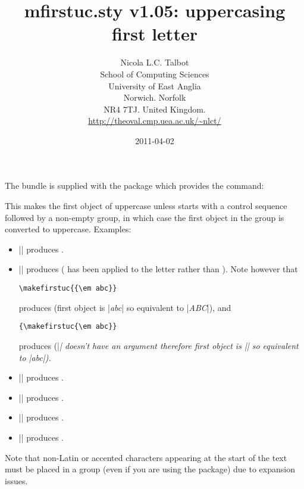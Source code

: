 \documentclass{nlctdoc}
\begin{document}
 \title{mfirstuc.sty v1.05: uppercasing first letter}
 \author{Nicola L.C. Talbot\\[10pt]
School of Computing Sciences\\
University of East Anglia\\
Norwich. Norfolk\\
NR4 7TJ. United Kingdom.\\
\url{http://theoval.cmp.uea.ac.uk/~nlct/}}

 \date{2011-04-02}
 \maketitle

The  bundle is supplied with the package 
 which provides the command:
\begin{definition}[\DescribeMacro{\makefirstuc}]
\end{definition}
This makes the first object of
 uppercase unless  starts with a control
sequence followed by a non-empty group, in which case the first
object in the group is converted to uppercase. Examples:
\begin{itemize}
\item || produces .

\item || produces 
( has been applied to the letter  rather
than ). Note however that
\begin{verbatim}
\makefirstuc{{\em abc}}
\end{verbatim}
produces  (first object is |{\em abc}| so
equivalent to |\MakeUppercase{\em abc}|), and
\begin{verbatim}
{\makefirstuc{\em abc}}
\end{verbatim}
produces {} (|\em| doesn't have an argument
therefore first object is |\em| so equivalent to
|{\MakeUppercase{\em}abc}|).

\item || produces .

\item || produces .

\item || produces .

\item || produces .

\end{itemize}
Note that non-Latin or accented characters appearing at the
start of the text must be placed in a group (even if you are
using the  package) due to expansion issues.
\end{document}
